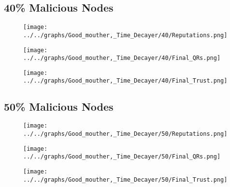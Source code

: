 \begin{minipage}[t]{0.49\columnwidth}
\subsection*{40\% Malicious Nodes}
    \begin{figure}[H]
        \centering
        \texttt{[image: ../../graphs/Good\_mouther,\_Time\_Decayer/40/Reputations.png]}
    \end{figure}
    \begin{figure}[H]
        \centering
        \texttt{[image: ../../graphs/Good\_mouther,\_Time\_Decayer/40/Final\_QRs.png]}
    \end{figure}
\end{minipage}
\begin{minipage}[t]{0.49\columnwidth}
    \begin{figure}[H]
        \centering
        \texttt{[image: ../../graphs/Good\_mouther,\_Time\_Decayer/40/Final\_Trust.png]}
    \end{figure}
\end{minipage}

\begin{minipage}[t]{0.49\columnwidth}
\subsection*{50\% Malicious Nodes}
    \begin{figure}[H]
        \centering
        \texttt{[image: ../../graphs/Good\_mouther,\_Time\_Decayer/50/Reputations.png]}
    \end{figure}
    \begin{figure}[H]
        \centering
        \texttt{[image: ../../graphs/Good\_mouther,\_Time\_Decayer/50/Final\_QRs.png]}
    \end{figure}
\end{minipage}
\begin{minipage}[t]{0.49\columnwidth}
    \begin{figure}[H]
        \centering
        \texttt{[image: ../../graphs/Good\_mouther,\_Time\_Decayer/50/Final\_Trust.png]}
    \end{figure}
\end{minipage}

